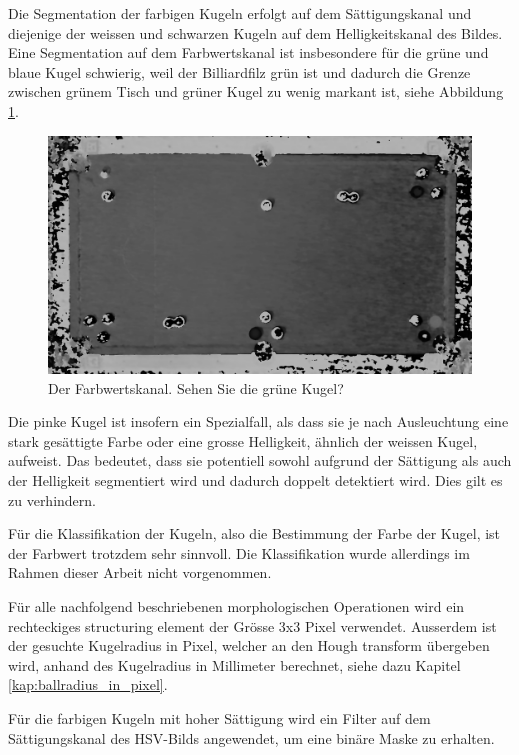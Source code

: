 Die Segmentation der farbigen Kugeln erfolgt auf dem Sättigungskanal und diejenige der weissen und schwarzen Kugeln auf dem Helligkeitskanal des Bildes.
Eine Segmentation auf dem Farbwertskanal ist insbesondere für die grüne und blaue Kugel schwierig, weil der Billiardfilz grün ist
und dadurch die Grenze zwischen grünem Tisch und grüner Kugel zu wenig markant ist, siehe Abbildung \ref{fig:hue_green_table_problem}.

\begin{figure}[h!]
    \begin{center}
    \includegraphics[width=0.8\linewidth]{../common/resources/detection/hue.png}
    \end{center}
    \caption{Der Farbwertskanal. Sehen Sie die grüne Kugel?}
    \label{fig:hue_green_table_problem}
\end{figure}

Die pinke Kugel ist insofern ein Spezialfall, als dass sie je nach Ausleuchtung eine stark gesättigte Farbe oder
eine grosse Helligkeit, ähnlich der weissen Kugel, aufweist. Das bedeutet, dass sie potentiell sowohl aufgrund
der Sättigung als auch der Helligkeit segmentiert wird und dadurch doppelt detektiert wird. Dies gilt es zu verhindern.

Für die Klassifikation der Kugeln, also die Bestimmung der Farbe der Kugel, ist der Farbwert trotzdem sehr sinnvoll.
Die Klassifikation wurde allerdings im Rahmen dieser Arbeit nicht vorgenommen.

Für alle nachfolgend beschriebenen morphologischen Operationen wird ein
rechteckiges structuring element der Grösse 3x3 Pixel verwendet.
Ausserdem ist der gesuchte Kugelradius in Pixel, welcher an den Hough transform übergeben wird, anhand des
Kugelradius in Millimeter berechnet, siehe dazu Kapitel \ref{kap:ballradius_in_pixel}.

Für die farbigen Kugeln mit hoher Sättigung wird ein Filter auf dem Sättigungskanal des HSV-Bilds
angewendet, um eine binäre Maske zu erhalten.

